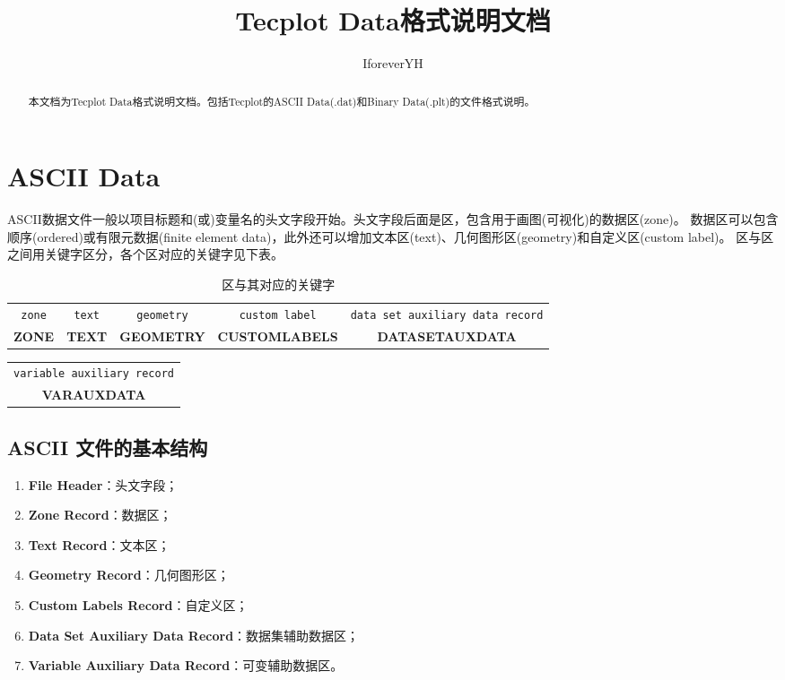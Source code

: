 \documentclass[lang=cn,11pt,a4paper]{elegantpaper}
\title{Tecplot Data格式说明文档}
\author{IforeverYH}
\institute{\textcolor{red}{网格文件转换项目}}
\date{\zhtoday}
\begin{document}
\maketitle

\begin{abstract}
  本文档为Tecplot Data格式说明文档。包括Tecplot的ASCII Data(.dat)和Binary Data(.plt)的文件格式说明。
\end{abstract}

\section{ASCII Data}

ASCII数据文件一般以项目标题和(或)变量名的头文字段开始。头文字段后面是区，包含用于画图(可视化)的数据区(zone)。
数据区可以包含顺序(ordered)或有限元数据(finite element data)，此外还可以增加文本区(text)、几何图形区(geometry)和自定义区(custom label)。
区与区之间用关键字区分，各个区对应的关键字见下表。

\begin{table}[!htb]
  \centering
  \caption{区与其对应的关键字}
  \label{keyword}
  \begin{tabular}{*{5}{c}}
   \hline
   \texttt{zone} & \texttt{text} & \texttt{geometry} &
   \texttt{custom label} & \texttt{data set auxiliary data record} \\
   \textbf{ZONE} & \textbf{TEXT} & \textbf{GEOMETRY} &
   \textbf{CUSTOMLABELS} & \textbf{DATASETAUXDATA} \\
   \hline
  \end{tabular}
\end{table}
\begin{table}[!htb]
  \centering
  \begin{tabular}{*{1}{c}}
   \hline
   \texttt{variable auxiliary record} \\
   \textbf{VARAUXDATA} \\
   \hline
  \end{tabular}
\end{table}

\subsection{ASCII 文件的基本结构}
\begin{enumerate}
  \item \textbf{File Header}：头文字段；
  \item \textbf{Zone Record}：数据区；
  \item \textbf{Text Record}：文本区；
  \item \textbf{Geometry Record}：几何图形区；
  \item \textbf{Custom Labels Record}：自定义区；
  \item \textbf{Data Set Auxiliary Data Record}：数据集辅助数据区；
  \item \textbf{Variable Auxiliary Data Record}：可变辅助数据区。
\end{enumerate}
\end{document}
